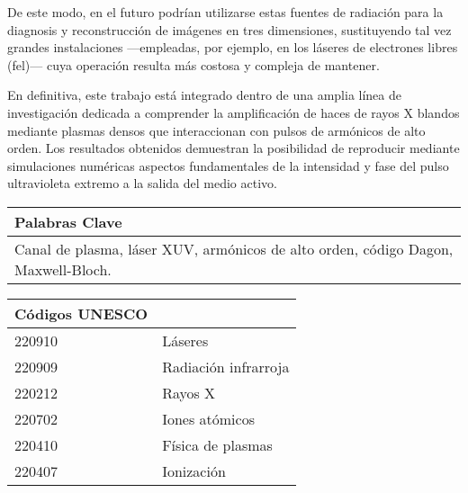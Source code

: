 De este modo, en el futuro podrían utilizarse estas fuentes de radiación para la diagnosis y reconstrucción de imágenes en tres dimensiones, sustituyendo tal vez grandes instalaciones ---empleadas, por ejemplo, en los láseres de electrones libres (\acrshort{fel})--- cuya operación resulta más costosa y compleja de mantener. 

En definitiva, este trabajo está integrado dentro de una amplia línea de investigación dedicada a comprender la amplificación de haces de rayos X blandos mediante plasmas densos que interaccionan con pulsos de armónicos de alto orden. Los resultados obtenidos demuestran la posibilidad de reproducir mediante simulaciones numéricas aspectos fundamentales de la intensidad y fase del pulso ultravioleta extremo a la salida del medio activo. 

\begin{table}[htpb]
    \begin{tabular}{l}
        \textbf{Palabras Clave} \\
        \midrule
         Canal de plasma, láser XUV, armónicos de alto orden, código Dagon, Maxwell-Bloch. 
    \end{tabular}
\end{table}

\begin{table}[htpb]
    \begin{tabular}{ll}
        \textbf{Códigos UNESCO} & \\
        \midrule
         220910 & Láseres \\
         220909 & Radiación infrarroja \\
         220212 & Rayos X \\
         220702 & Iones atómicos \\
         220410 & Física de plasmas \\
         220407 & Ionización 
    \end{tabular}
\end{table}
